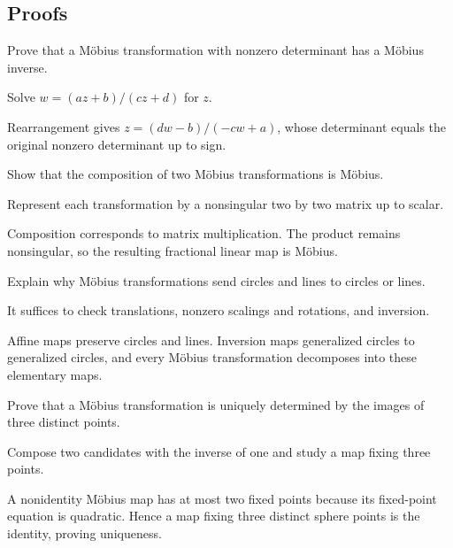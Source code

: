 \subsection*{Proofs}

\begin{exercise}\label{exr:iv16-expand-06}
Prove that a Möbius transformation with nonzero determinant has a Möbius inverse.
\end{exercise}
\begin{hint}
Solve \(w=(az+b)/(cz+d)\) for \(z\).
\end{hint}
\begin{solution}
Rearrangement gives \(z=(dw-b)/(-cw+a)\), whose determinant equals the original nonzero determinant up to sign.
\end{solution}

\begin{exercise}\label{exr:iv16-expand-07}
Show that the composition of two Möbius transformations is Möbius.
\end{exercise}
\begin{hint}
Represent each transformation by a nonsingular two by two matrix up to scalar.
\end{hint}
\begin{solution}
Composition corresponds to matrix multiplication. The product remains nonsingular, so the resulting fractional linear map is Möbius.
\end{solution}

\begin{exercise}\label{exr:iv16-expand-08}
Explain why Möbius transformations send circles and lines to circles or lines.
\end{exercise}
\begin{hint}
It suffices to check translations, nonzero scalings and rotations, and inversion.
\end{hint}
\begin{solution}
Affine maps preserve circles and lines. Inversion maps generalized circles to generalized circles, and every Möbius transformation decomposes into these elementary maps.
\end{solution}

\begin{exercise}\label{exr:iv16-expand-09}
Prove that a Möbius transformation is uniquely determined by the images of three distinct points.
\end{exercise}
\begin{hint}
Compose two candidates with the inverse of one and study a map fixing three points.
\end{hint}
\begin{solution}
A nonidentity Möbius map has at most two fixed points because its fixed-point equation is quadratic. Hence a map fixing three distinct sphere points is the identity, proving uniqueness.
\end{solution}

